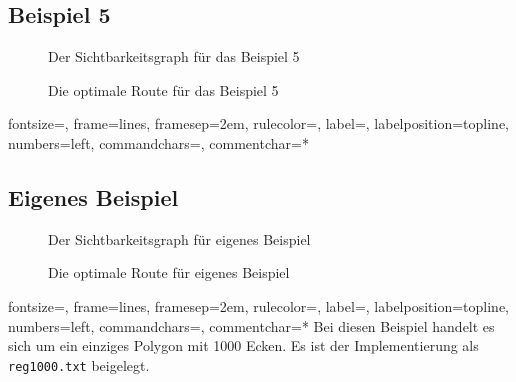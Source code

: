 \documentclass[a4paper, notitlepage, 12pt]{scrartcl}
\begin{document}
\subsection{Beispiel 5}
\begin{minipage}[b]{0.45\linewidth}
	\begin{figure}[H]
		
		\caption{Der Sichtbarkeitsgraph für das Beispiel 5}
	\end{figure}
\end{minipage}
\hspace{0.5cm}
\begin{minipage}[b]{0.45\linewidth}
	\begin{figure}[H] 
		\caption{Die optimale Route für das Beispiel 5}
	\end{figure}
\end{minipage}
{fontsize=\footnotesize,
	frame=lines,  %
	framesep=2em, %
	rulecolor=\color{Gray},
	label=,
	labelposition=topline,
	numbers=left,
	commandchars=\|\(\), %
	commentchar=*        %
}
\subsection*{Eigenes Beispiel}
\begin{minipage}[b]{0.45\linewidth}
	\begin{figure}[H]
		
		\caption{Der Sichtbarkeitsgraph für eigenes Beispiel}
	\end{figure}
\end{minipage}
\hspace{0.5cm}
\begin{minipage}[b]{0.45\linewidth}
	\begin{figure}[H] 
		\caption{Die optimale Route für eigenes Beispiel}
	\end{figure}
\end{minipage}
%
{fontsize=\footnotesize,
	frame=lines,  %
	framesep=2em, %
	rulecolor=\color{Gray},
	label=,
	labelposition=topline,
	numbers=left,
	commandchars=\|\(\), %
	commentchar=*        %
}
Bei diesen Beispiel handelt es sich um ein einziges Polygon mit 1000 Ecken. Es ist der Implementierung als \texttt{reg1000.txt} beigelegt.
\end{document}
